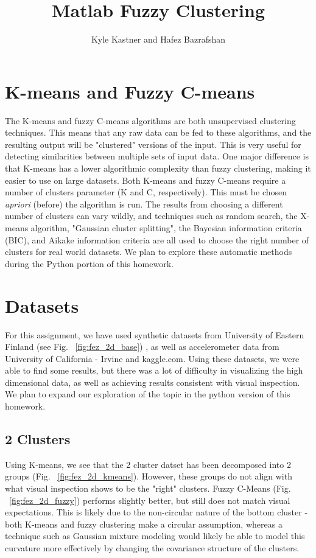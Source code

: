 \documentclass{article}
\begin{document}
\title{Matlab Fuzzy Clustering}
\author{Kyle Kastner and Hafez Bazrafshan}

\maketitle

\section*{K-means and Fuzzy C-means}
The K-means and fuzzy C-means algorithms \cite{ClusterAgg} are both unsupervised clustering
techniques. This means that any raw data can be fed to these algorithms, and
the resulting output will be "clustered" versions of the input. This is very
useful for detecting similarities between multiple sets of input data. One major difference is that
K-means has a lower algorithmic complexity than fuzzy clustering, making it easier to use on large datasets.
\vspace*{1\baselineskip}
Both K-means and fuzzy C-means require a number of
clusters parameter (K and C, respectively). This must be chosen \emph{apriori} 
(before) the algorithm is run.
The results from choosing a different number of clusters can vary wildly, and
techniques such as random search, the X-means algorithm, 
"Gaussian cluster splitting", the Bayesian information criteria (BIC), 
and Aikake information criteria are all used to choose the right number of
clusters for real world datasets. We plan to explore these automatic methods
during the Python portion of this homework.
\vspace*{1\baselineskip}

\section*{Datasets}
For this assignment, we have used synthetic datasets from 
University of Eastern Finland \cite{2DClust} (see Fig. ~\ref{fig:fez_2d_base})
, as well as accelerometer data from University of California - Irvine \cite{UCIML}
and kaggle.com. Using these datasets, we were able to find some results, but
there was a lot of difficulty in visualizing the high dimensional data, 
as well as achieving results consistent with visual inspection. 
We plan to expand our exploration of the topic in the python version of this homework.

\subsection*{2 Clusters}
Using K-means, we see that the 2 cluster datset has been decomposed into 2 groups (Fig. ~\ref{fig:fez_2d_kmeans}).
However, these groups do not align with what visual inspection shows to be the "right" clusters.
Fuzzy C-Means (Fig. ~\ref{fig:fez_2d_fuzzy}) performs slightly better, but still does not match visual expectations.
This is likely due to the non-circular nature of the bottom cluster - both K-means and fuzzy clustering make 
a circular assumption, whereas a technique such as Gaussian mixture modeling would likely be able to model
this curvature more effectively by changing the covariance structure of the clusters.
\end{document}
